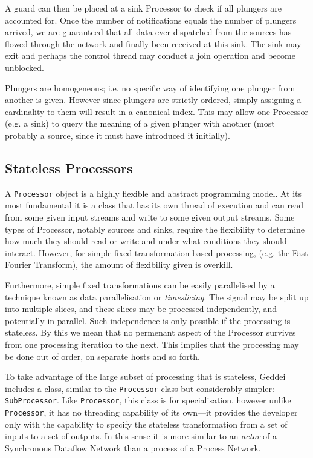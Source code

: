 A guard can then be placed at a sink Processor to check if all plungers are accounted for. Once the number of notifications equals the number of plungers arrived, we are guaranteed that all data ever dispatched from the sources has flowed through the network and finally been received at this sink. The sink may exit and perhaps the control thread may conduct a join operation and become unblocked.

Plungers are homogeneous; i.e. no specific way of identifying one plunger from another is given. However since plungers are strictly ordered, simply assigning a cardinality to them will result in a canonical index. This may allow one Processor (e.g. a sink) to query the meaning of a given plunger with another (most probably a source, since it must have introduced it initially).

\subsection{Stateless Processors}\label{sec:statelessprocessors}


A \texttt{Processor} object is a highly flexible and abstract programming model. At its most fundamental it is a class that has its own thread of execution and can read from some given input streams and write to some given output streams. Some types of Processor, notably sources and sinks, require the flexibility to determine how much they should read or write and under what conditions they should interact. However, for simple fixed transformation-based processing, (e.g. the Fast Fourier Transform), the amount of flexibility given is overkill.

Furthermore, simple fixed transformations can be easily parallelised by a technique known as data parallelisation or \textit{timeslicing}. The signal may be split up into multiple slices, and these slices may be processed independently, and potentially in parallel. Such independence is only possible if the processing is stateless. By this we mean that no permenant aspect of the Processor survives from one processing iteration to the next. This implies that the processing may be done out of order, on separate hosts and so forth.

To take advantage of the large subset of processing that is stateless, Geddei includes a class, similar to the \texttt{Processor} class but considerably simpler: \texttt{SubProcessor}. Like \texttt{Processor}, this class is for specialisation, however unlike \texttt{Processor}, it has no threading capability of its own---it provides the developer only with the capability to specify the stateless transformation from a set of inputs to a set of outputs. In this sense it is more similar to an \textit{actor} of a Synchronous Dataflow Network than a process of a Process Network.

